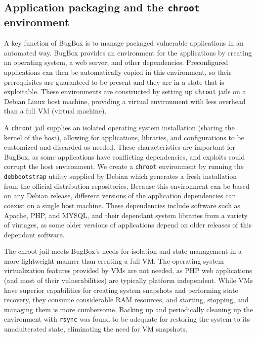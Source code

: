 \documentclass[letterpaper,twocolumn,10pt]{article}
\begin{document}
\subsection{Application packaging and the {\tt chroot} environment}

A key function of BugBox is to manage packaged vulnerable applications in an automated way. BugBox provides an environment for the applications by creating an operating system, a web server, and other dependencies. Preconfigured applications can then be automatically copied in this environment, so their prerequisites are guaranteed to be present and they are in a state that is exploitable. These environments are constructed by setting up {\tt chroot} jails on a Debian Linux host machine, providing a virtual environment with less overhead than a full VM (virtual machine).

A \texttt{chroot} jail supplies an isolated operating system installation (sharing the kernel of the host), allowing for applications, libraries, and configurations to be customized and discarded as needed. These characteristics are important for BugBox, as some applications have conflicting dependencies, and exploits could corrupt the host environment. We create a \texttt{chroot} environment by running the \texttt{debbootstrap} utility supplied by Debian which generates a fresh installation from the official distribution repositories. Because this environment can be based on any Debian release, different versions of the application dependencies can coexist on a single host machine. These dependencies include software such as Apache, PHP, and MYSQL, and their dependant system libraries from a variety of vintages, as some older versions of applications depend on older releases of this dependant software.

The chroot jail meets BugBox's needs for isolation and state management in a more lightweight manner than creating a full VM. The operating system virtualization features provided by VMs are not needed, as PHP web applications (and most of their vulnerabilities) are typically platform independent. While VMs have superior capabilities for creating system snapshots and performing state recovery, they consume considerable RAM resources, and starting, stopping, and managing them is more cumbersome. Backing up and periodically cleaning up the environment with \texttt{rsync} was found to be adequate for restoring the system to its unadulterated state, eliminating the need for VM snapshots.
\end{document}
